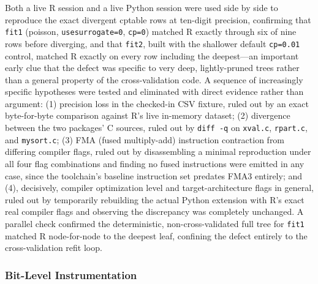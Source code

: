 \documentclass[12pt]{article}
\begin{document}
Both a live R session and a live Python session were used side by side to reproduce the exact divergent cptable rows at ten-digit precision, confirming that \texttt{fit1} (poisson, \texttt{usesurrogate=0}, \texttt{cp=0}) matched R exactly through six of nine rows before diverging, and that \texttt{fit2}, built with the shallower default \texttt{cp=0.01} control, matched R exactly on every row including the deepest---an important early clue that the defect was specific to very deep, lightly-pruned trees rather than a general property of the cross-validation code. A sequence of increasingly specific hypotheses were tested and eliminated with direct evidence rather than argument: (1) precision loss in the checked-in CSV fixture, ruled out by an exact byte-for-byte comparison against R's live in-memory dataset; (2) divergence between the two packages' C sources, ruled out by \texttt{diff -q} on \texttt{xval.c}, \texttt{rpart.c}, and \texttt{mysort.c}; (3) FMA (fused multiply-add) instruction contraction from differing compiler flags, ruled out by disassembling a minimal reproduction under all four flag combinations and finding no fused instructions were emitted in any case, since the toolchain's baseline instruction set predates FMA3 entirely; and (4), decisively, compiler optimization level and target-architecture flags in general, ruled out by temporarily rebuilding the actual Python extension with R's exact real compiler flags and observing the discrepancy was completely unchanged. A parallel check confirmed the deterministic, non-cross-validated full tree for \texttt{fit1} matched R node-for-node to the deepest leaf, confining the defect entirely to the cross-validation refit loop.

\subsubsection{Bit-Level Instrumentation}
\end{document}
